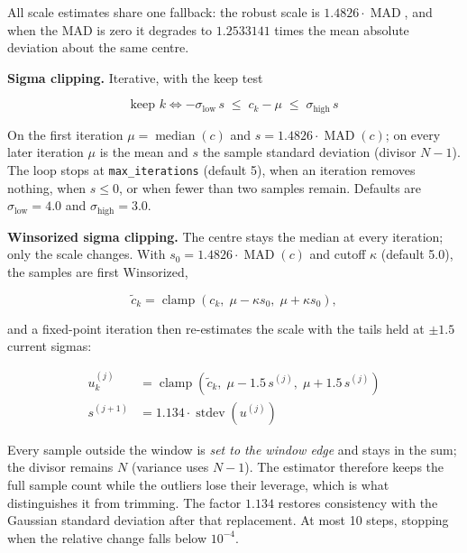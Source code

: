 \documentclass[11pt,a4paper]{article}
\newcommand{\code}[1]{\texttt{\small #1}}
\begin{document}
    All scale estimates share one fallback: the robust scale is $1.4826 \cdot \operatorname{MAD}$, and when the MAD is zero it degrades to $1.2533141$ times the mean absolute deviation about the same centre.

    \textbf{Sigma clipping.} Iterative, with the keep test

    \begin{equation}
        \boxed{
            \text{keep } k \iff -\sigma_{\text{low}} \, s \;\le\; c_k - \mu \;\le\; \sigma_{\text{high}} \, s
        }
        \label{eq:sigma_keep}
    \end{equation}

    On the first iteration $\mu = \operatorname{median}(c)$ and $s = 1.4826 \cdot \operatorname{MAD}(c)$; on every later iteration $\mu$ is the mean and $s$ the sample standard deviation (divisor $N-1$). The loop stops at \code{max\_iterations} (default 5), when an iteration removes nothing, when $s \leq 0$, or when fewer than two samples remain. Defaults are $\sigma_{\text{low}} = 4.0$ and $\sigma_{\text{high}} = 3.0$.

    \textbf{Winsorized sigma clipping.} The centre stays the median at every iteration; only the scale changes. With $s_0 = 1.4826 \cdot \operatorname{MAD}(c)$ and cutoff $\kappa$ (default 5.0), the samples are first Winsorized,

    \begin{equation}
        \tilde{c}_k = \operatorname{clamp}\!\left(c_k,\; \mu - \kappa s_0,\; \mu + \kappa s_0\right),
    \end{equation}

    and a fixed-point iteration then re-estimates the scale with the tails held at $\pm 1.5$ current sigmas:

    \begin{align}
        u_k^{(j)} &= \operatorname{clamp}\!\left(\tilde{c}_k,\; \mu - 1.5\,s^{(j)},\; \mu + 1.5\,s^{(j)}\right) \\[4pt]
        s^{(j+1)} &= 1.134 \cdot \operatorname{stdev}\!\left(u^{(j)}\right)
    \end{align}

    \begin{notebox}
        Every sample outside the window is \emph{set to the window edge} and stays in the sum; the divisor remains $N$ (variance uses $N-1$). The estimator therefore keeps the full sample count while the outliers lose their leverage, which is what distinguishes it from trimming. The factor $1.134$ restores consistency with the Gaussian standard deviation after that replacement. At most 10 steps, stopping when the relative change falls below $10^{-4}$.
    \end{notebox}
\end{document}
